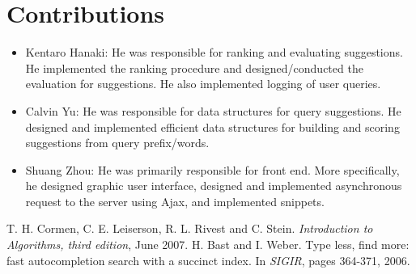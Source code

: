 \documentclass{article}
\begin{document}
\section{Contributions}

\begin{itemize}
\item Kentaro Hanaki: He was responsible for ranking and evaluating suggestions. He implemented the ranking procedure and designed/conducted the evaluation for suggestions. He also implemented logging of user queries.
\item Calvin Yu: He was responsible for data structures for query suggestions. He designed and implemented efficient data structures for building and scoring suggestions from query prefix/words.
\item Shuang Zhou: He was primarily responsible for front end. More specifically, he designed graphic user interface, designed and implemented asynchronous request to the server using Ajax, and implemented snippets.
\end{itemize}


\begin{thebibliography}{1}

 T. H. Cormen, C. E. Leiserson, R. L. Rivest and C. Stein. {\em Introduction to Algorithms, third edition}, June 2007.
 H. Bast and I. Weber. Type less, find more: fast autocompletion search with a succinct index. In {\em SIGIR}, pages 364-371, 2006.

\end{thebibliography}
\end{document}
